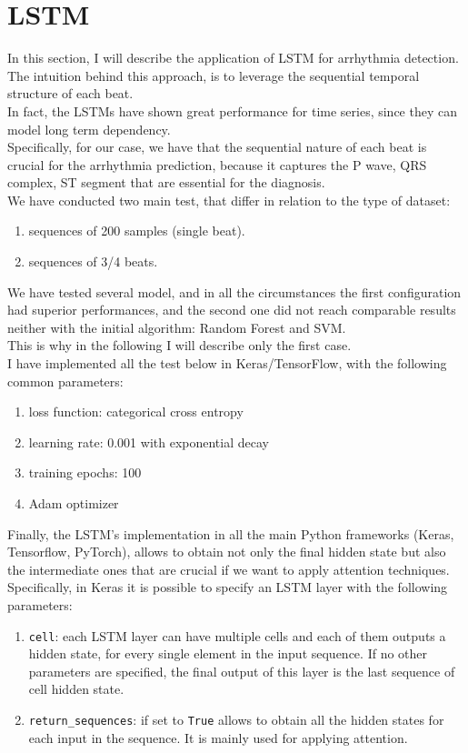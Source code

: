 \documentclass[LaM,binding=0.6cm]{sapthesis}
\begin{document}
\section{LSTM}
In this section, I will describe the application of LSTM for arrhythmia detection. The intuition behind this approach, is to leverage the sequential temporal structure of each beat.\\In fact, the LSTMs have shown great performance for time series, since they can model long term dependency.\\Specifically, for our case, we have that the sequential nature of each beat is crucial for the arrhythmia prediction, because it captures the P wave, QRS complex, ST segment that are essential for the diagnosis.\\We have conducted two main test, that differ in relation to the type of dataset: 
\begin{enumerate}
\item sequences of 200 samples (single beat).
\item sequences of 3/4 beats.
\end{enumerate}
We have tested several model, and in all the circumstances the first configuration had superior performances, and the second one did not reach comparable results neither with the initial algorithm: Random Forest and SVM.\\This is why in the following I will describe only the first case.\\I have implemented all the test below in Keras/TensorFlow, with the following common parameters:
\begin{enumerate}
\item loss function: categorical cross entropy
\item learning rate: 0.001 with exponential decay
\item training epochs: 100
\item Adam optimizer 
\end{enumerate}
Finally, the LSTM's implementation in all the main Python frameworks (Keras, Tensorflow, PyTorch), allows to obtain not only the final hidden state but also the intermediate ones that are crucial if we want to apply attention techniques.\\Specifically, in Keras it is possible to specify an LSTM layer with the following parameters:
\begin{enumerate}
\item \texttt{cell}: each LSTM layer can have multiple cells and each of them outputs a hidden state, for every single element in the input sequence. If no other parameters are specified, the final output of this layer is the last sequence of cell hidden state.
\item \texttt{return\_sequences}: if set to \texttt{True} allows to obtain all the hidden states for each input in the sequence. It is mainly used for applying attention.
\end{enumerate}
\end{document}
